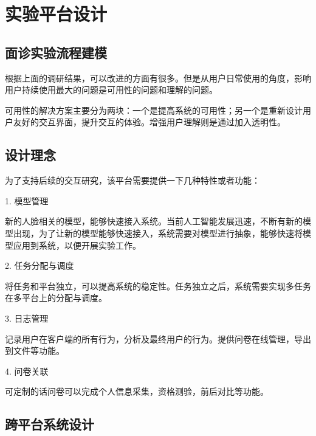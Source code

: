 \chapter{实验平台设计}


\section{面诊实验流程建模}



根据上面的调研结果，可以改进的方面有很多。但是从用户日常使用的角度，影响用户持续使用最大的问题是可用性的问题和理解的问题。

可用性的解决方案主要分为两块：一个是提高系统的可用性；另一个是重新设计用户友好的交互界面，提升交互的体验。增强用户理解则是通过加入透明性。



\section{设计理念}



为了支持后续的交互研究，该平台需要提供一下几种特性或者功能：

1. 模型管理

新的人脸相关的模型，能够快速接入系统。当前人工智能发展迅速，不断有新的模型出现，为了让新的模型能够快速接入，系统需要对模型进行抽象，能够快速将模型应用到系统，以便开展实验工作。

2. 任务分配与调度

将任务和平台独立，可以提高系统的稳定性。任务独立之后，系统需要实现多任务在多平台上的分配与调度。

3. 日志管理

记录用户在客户端的所有行为，分析及最终用户的行为。提供问卷在线管理，导出到文件等功能。

4. 问卷关联

可定制的话问卷可以完成个人信息采集，资格测验，前后对比等功能。




\section{跨平台系统设计}

